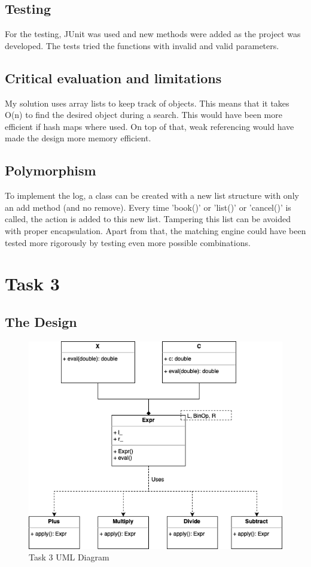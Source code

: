 \documentclass[a4paper, 12pt]{report}
\begin{document}
\subsection{Testing}
For the testing, JUnit was used and new methods were added as the project was developed. The tests tried the functions with invalid and valid parameters.

\subsection{Critical evaluation and limitations}
My solution uses array lists to keep track of objects. This means that it takes O(n) to find the desired object during a search. This would have been more efficient if hash maps where used. On top of that, weak referencing would have made the design more memory efficient.

\subsection{Polymorphism}
To implement the log, a class can be created with a new list structure with only an add method (and no remove). Every time 'book()' or 'list()' or 'cancel()' is called, the action is added to this new list. Tampering this list can be avoided with proper encapsulation.
\linebreak
Apart from that, the matching engine could have been tested more rigorously by testing even more possible combinations.

\section{Task 3}

\subsection{The Design}

\begin{figure}[H]
    \centering
    \includegraphics[width=1\textwidth]{"UML 3"}
    \caption{Task 3 UML Diagram}
\end{figure}
\end{document}
